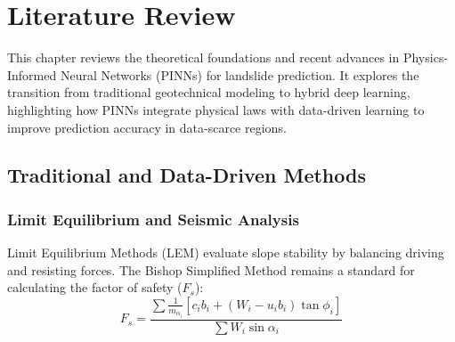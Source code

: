 \documentclass[12pt]{report}
\begin{document}
\chapter{Literature Review}This chapter reviews the theoretical foundations and recent advances in Physics-Informed Neural Networks (PINNs) for landslide prediction. It explores the transition from traditional geotechnical modeling to hybrid deep learning, highlighting how PINNs integrate physical laws with data-driven learning to improve prediction accuracy in data-scarce regions.\section{Traditional and Data-Driven Methods}\subsection{Limit Equilibrium and Seismic Analysis}Limit Equilibrium Methods (LEM) evaluate slope stability by balancing driving and resisting forces. The Bishop Simplified Method \citep{bishop1955use} remains a standard for calculating the factor of safety ($F_s$):\begin{equation}F_s = \frac{\sum \frac{1}{m_{\alpha_i}} \left[ c_i b_i + (W_i - u_i b_i) \tan \phi_i \right]}{\sum W_i \sin \alpha_i}\end{equation}
\newline
{}
\end{document}
